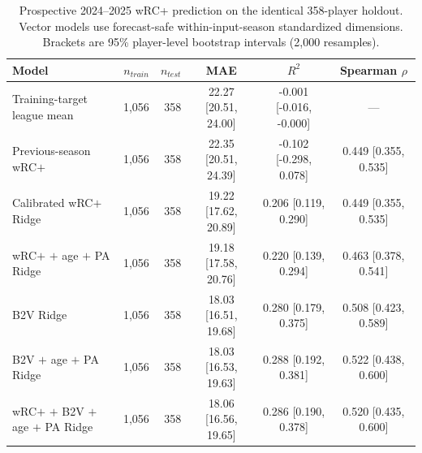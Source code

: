 \begin{table}[t]
\centering
\caption{Prospective 2024--2025 wRC+ prediction on the identical 358-player holdout. Vector models use forecast-safe within-input-season standardized dimensions. Brackets are 95\% player-level bootstrap intervals (2,000 resamples).}
\label{tab:prospective}
\scriptsize
\setlength{\tabcolsep}{3pt}
\begin{tabular}{lrrccc}
\toprule
Model & $n_{train}$ & $n_{test}$ & MAE & $R^2$ & Spearman $\rho$ \\
\midrule
Training-target league mean & 1,056 & 358 & 22.27 [20.51, 24.00] & -0.001 [-0.016, -0.000] & --- \\
Previous-season wRC$+$ & 1,056 & 358 & 22.35 [20.51, 24.39] & -0.102 [-0.298, 0.078] & 0.449 [0.355, 0.535] \\
Calibrated wRC$+$ Ridge & 1,056 & 358 & 19.22 [17.62, 20.89] & 0.206 [0.119, 0.290] & 0.449 [0.355, 0.535] \\
wRC$+$ $+$ age $+$ PA Ridge & 1,056 & 358 & 19.18 [17.58, 20.76] & 0.220 [0.139, 0.294] & 0.463 [0.378, 0.541] \\
B2V Ridge & 1,056 & 358 & 18.03 [16.51, 19.68] & 0.280 [0.179, 0.375] & 0.508 [0.423, 0.589] \\
B2V $+$ age $+$ PA Ridge & 1,056 & 358 & 18.03 [16.53, 19.63] & 0.288 [0.192, 0.381] & 0.522 [0.438, 0.600] \\
wRC$+$ $+$ B2V $+$ age $+$ PA Ridge & 1,056 & 358 & 18.06 [16.56, 19.65] & 0.286 [0.190, 0.378] & 0.520 [0.435, 0.600] \\
\bottomrule
\end{tabular}
\end{table}
